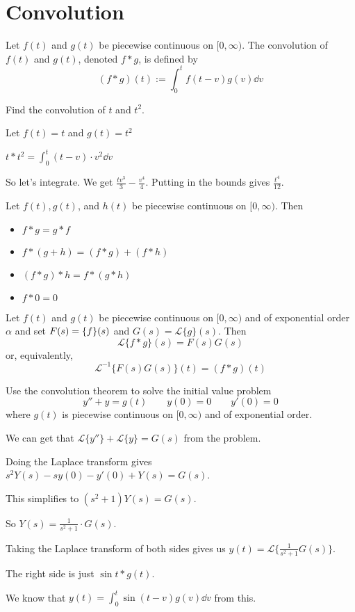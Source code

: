 \documentclass[../diffeq.tex]{subfiles}
\begin{document}
\pagebreak
\section{Convolution}
\begin{definition}
    Let $f(t)$ and $g(t)$ be piecewise continuous on $[0,\infty)$. The convolution of $f(t)$ and $g(t)$, denoted $f \ast g$, is defined by 
    \[ (f\ast g)(t) := \int_0^t f(t-v)g(v)\dd v \]
\end{definition}

\begin{example}
    Find the convolution of $t$ and $t^2$.

    Let $f(t)=t$ and $g(t)=t^2$

    $t\ast t^2 = \int_0^t (t-v)\cdot v^2 \dd v$

    So let's integrate. We get $\frac{tv^3}{3}-\frac{v^4}{4}$. Putting in the bounds gives $\frac{t^4}{12}$.
\end{example}

\begin{theorem}
    Let $f(t), g(t)$, and $h(t)$ be piecewise continuous on $[0,\infty)$. Then 
    \begin{itemize}
        \item $f\ast g = g\ast f$
        \item $f\ast (g+h) = (f\ast g)+(f\ast h)$
        \item $(f\ast g)\ast h = f\ast (g\ast h)$
        \item $f\ast 0 =0$
    \end{itemize}
\end{theorem}

\begin{theorem}
    Let $f(t)$ and $g(t)$ be piecewise continuous on $[0,\infty)$ and of exponential order $\alpha$ and set $F(s)=\mathcal\{f\}(s)$ and $G(s)=\mathcal{L}\{g\}(s)$. Then 
    \[ \mathcal{L}\{f\ast g\}(s)=F(s)G(s)\]
    or, equivalently,
    \[ \mathcal{L}^{-1}\{F(s)G(s)\}(t)=(f\ast g)(t) \]
\end{theorem}

\begin{example}
    Use the convolution theorem to solve the initial value problem 
    \[ y''+y=g(t) \qquad y(0)=0 \qquad y'(0)=0 \]
    where $g(t)$ is piecewise continuous on $[0,\infty)$ and of exponential order.

    We can get that $\mathcal{L}\{y''\}+\mathcal{L}\{y\} = G(s)$ from the problem.

    Doing the Laplace transform gives $s^2Y(s)-sy(0)-y'(0)+Y(s)=G(s)$.

    This simplifies to $(s^2+1)Y(s)=G(s)$.

    So $Y(s)=\frac{1}{s^2+1}\cdot G(s)$.

    Taking the Laplace transform of both sides gives us $y(t)=\mathcal{L}\{\frac{1}{s^2+1}G(s)\}$.

    The right side is just $\sin t\ast g(t)$.

    We know that $y(t)=\int_0^t \sin(t-v)g(v)\dd v$ from this.
\end{example}
\end{document}
